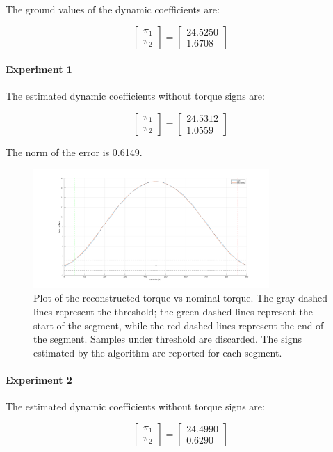 \documentclass{article}
\begin{document}
The ground values of the dynamic coefficients are:

\[\begin{bmatrix}
\pi_1 \\ \pi_2
\end{bmatrix}=\begin{bmatrix}
24.5250 \\ 1.6708
\end{bmatrix}\]

\paragraph{Experiment 1} The estimated dynamic coefficients without torque signs are:

\[\begin{bmatrix}
\pi_1  \\ \pi_2 
\end{bmatrix}=\begin{bmatrix}
24.5312 \\ 1.0559
\end{bmatrix}\]

The norm of the error is 0.6149.

\begin{figure}[!htbp]
\centering
\includegraphics[width=0.8\textwidth]{images/1-dof/results_new_experiment1.png}
\caption{Plot of the reconstructed torque vs nominal torque. The gray dashed lines represent the threshold; the green dashed lines represent the start of the segment, while the red dashed lines represent the end of the segment. Samples under threshold are discarded. The signs estimated by the algorithm are reported for each segment.}
\end{figure}
\FloatBarrier
\paragraph{Experiment 2} The estimated dynamic coefficients without torque signs are:

\[\begin{bmatrix}
\pi_1  \\ \pi_2 
\end{bmatrix}=\begin{bmatrix}
24.4990 \\ 0.6290
\end{bmatrix}\]
\end{document}
